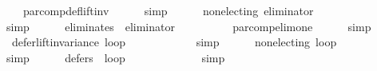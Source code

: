\begin{isabellebody}
\ {}{}{}\ {}{}{}\ {}{}{}\ par{\isacharunderscore}{\kern0pt}comp{\isacharunderscore}{\kern0pt}def{\isacharunderscore}{\kern0pt}lift{\isacharunderscore}{\kern0pt}inv\isanewline
\ \ \ \ \isamarkupfalse%
\ simp\ \isanewline
\ \ \isamarkupfalse%
\ {}{}{\isacharcolon}{\kern0pt}\ {\isachardoublequoteopen}non{\isacharunderscore}{\kern0pt}electing\ {\isacharquery}{\kern0pt}eliminator{\isachardoublequoteclose}\isanewline
\ \ \ \ \isamarkupfalse%
\ {}{}{}\ {}{}{}\ {}{}{}\isanewline
\ \ \ \ \isamarkupfalse%
\ simp\ \isanewline
\ \ \isamarkupfalse%
\ {}{}{\isacharcolon}{\kern0pt}\ {\isachardoublequoteopen}eliminates\ {}\ {\isacharquery}{\kern0pt}eliminator{\isachardoublequoteclose}\isanewline
\ \ \ \ \isamarkupfalse%
\ {}{}{}\ {}{}{}\ {}{}{}\ {}{}{}\ par{\isacharunderscore}{\kern0pt}comp{\isacharunderscore}{\kern0pt}elim{\isacharunderscore}{\kern0pt}one\isanewline
\ \ \ \ \isamarkupfalse%
\ simp\isanewline
\isanewline
\ \ \isamarkupfalse%
\ {}{\isacharcolon}{\kern0pt}\ {\isachardoublequoteopen}defer{\isacharunderscore}{\kern0pt}lift{\isacharunderscore}{\kern0pt}invariance\ {\isacharquery}{\kern0pt}loop{\isachardoublequoteclose}\isanewline
\ \ \ \ \isamarkupfalse%
\ {}{}\isanewline
\ \ \ \ \isamarkupfalse%
\ simp\ \isanewline
\ \ \isamarkupfalse%
\ {}{\isacharcolon}{\kern0pt}\ {\isachardoublequoteopen}non{\isacharunderscore}{\kern0pt}electing\ {\isacharquery}{\kern0pt}loop{\isachardoublequoteclose}\isanewline
\ \ \ \ \isamarkupfalse%
\ {}{}\isanewline
\ \ \ \ \isamarkupfalse%
\ simp\ \isanewline
\ \ \isamarkupfalse%
\ {}{\isacharcolon}{\kern0pt}\ {\isachardoublequoteopen}defers\ {}\ {\isacharquery}{\kern0pt}loop{\isachardoublequoteclose}\isanewline
\ \ \ \ \isamarkupfalse%
\ {}{}\ {}{}\isanewline
\ \ \ \ \isamarkupfalse%
\ simp\ \isanewline
\ \ \isamarkupfalse%

\end{isabellebody}
